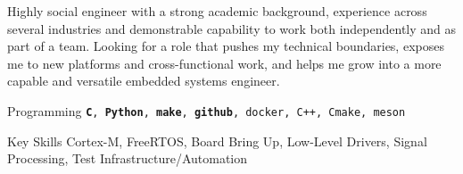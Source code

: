 
    Highly social engineer with a strong academic background, experience across several industries and demonstrable capability to work both independently and as part of a team.
    Looking for a role that pushes my technical boundaries, exposes me to new platforms and cross-functional work, and helps me grow into a more capable and versatile embedded systems engineer.

\begin{cvskills}

  \cvskill
    {Programming} %
    {\texttt{\textbf{C}, \textbf{Python}, \textbf{make}, \textbf{github}, docker, C++, Cmake, meson}} %

  \cvskill
    {Key Skills} %
    {Cortex-M, FreeRTOS, Board Bring Up, Low-Level Drivers, Signal Processing, Test Infrastructure/Automation} %

\end{cvskills}
